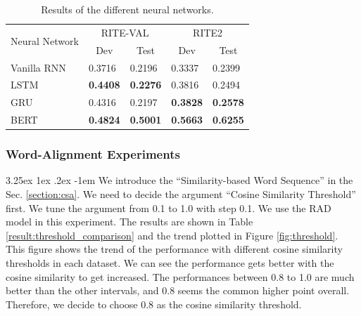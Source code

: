 \documentclass[12pt]{article}
\makeatletter
\renewcommand\paragraph{\@startsection{paragraph}{5}{\z@}%
  {3.25ex \@plus1ex \@minus.2ex}%
  {-1em}%
  {\normalfont\normalsize\bfseries}}
\makeatother
\begin{document}
\begin{CJK*}{UTF8}{bkai}
\begin{spacing}{1.77}
\begin{table}[H]
  \centering
  \setlength{\extrarowheight}{-3pt}
  \begin{tabular}{|l|l|l|l|l|}
  \hline
  \multirow{2}{*}{Neural Network} & \multicolumn{2}{c|}{RITE-VAL} & \multicolumn{2}{c|}{RITE2} \\ \cline{2-5}
   & \multicolumn{1}{c|}{Dev} & \multicolumn{1}{c|}{Test} & \multicolumn{1}{c|}{Dev} & \multicolumn{1}{c|}{Test} \\ \hline
  Vanilla RNN & 0.3716 & 0.2196 & 0.3337 & 0.2399 \\ \hline
  LSTM & \textbf{0.4408} & \textbf{0.2276} & 0.3816 & 0.2494 \\ \hline
  GRU & 0.4316 & 0.2197 & \textbf{0.3828} & \textbf{0.2578} \\ \hline
  BERT & \textbf{0.4824} & \textbf{0.5001} & \textbf{0.5663} & \textbf{0.6255} \\ \hline
  \end{tabular}
  \caption{Results of the different neural networks.}
  \label{result:rnn_types}
\end{table}

\subsubsection{Word-Alignment Experiments}
\paragraph{}
We introduce the ``Similarity-based Word Sequence'' in the Sec. \ref{section:csa}. We need to decide the argument ``Cosine Similarity Threshold'' first. We tune the argument from 0.1 to 1.0 with step 0.1. We use the RAD model in this experiment. The results are shown in Table \ref{result:threshold_comparison} and the trend plotted in Figure \ref{fig:threshold}. This figure shows the trend of the performance with different cosine similarity thresholds in each dataset. We can see the performance gets better with the cosine similarity to get increased. The performances between 0.8 to 1.0 are much better than the other intervals, and 0.8 seems the common higher point overall. Therefore, we decide to choose 0.8 as the cosine similarity threshold.


\end{spacing}
\end{CJK*}
\end{document}
